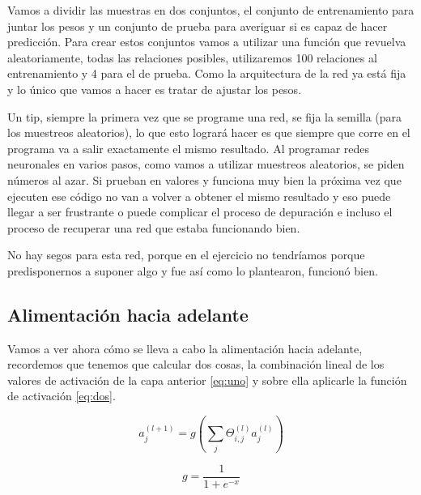 Vamos a dividir las muestras en dos conjuntos, el conjunto de entrenamiento para juntar los pesos y un conjunto de prueba para averiguar si es capaz de hacer predicción. Para crear estos conjuntos vamos a utilizar  una función que revuelva aleatoriamente, todas las relaciones posibles, utilizaremos 100 relaciones al entrenamiento y 4 para el de prueba. Como la arquitectura de la red ya está fija y lo único que vamos a hacer es tratar de ajustar los pesos.

Un tip, siempre la primera vez que se programe una red, se fija la semilla (para los muestreos aleatorios), lo que esto logrará hacer es que siempre que corre en el programa va a salir exactamente el mismo resultado. Al programar redes neuronales en varios pasos, como vamos a utilizar muestreos aleatorios, se piden números al azar. Si prueban en valores y funciona muy bien la próxima vez que ejecuten ese código no van a volver a obtener el mismo resultado y eso puede llegar a ser frustrante o puede complicar  el proceso de depuración e incluso el proceso de recuperar una red que estaba funcionando bien. 

No hay segos para esta red, porque  en el ejercicio no tendríamos porque predisponernos a suponer algo y fue así como lo plantearon, funcionó bien. 

\subsection{Alimentación hacia adelante}

Vamos a ver ahora cómo se lleva a cabo la alimentación hacia adelante, recordemos que tenemos que calcular dos cosas, la combinación lineal de los valores de activación de la capa anterior \ref{eq:uno} y sobre ella aplicarle la función de activación \ref{eq:dos}.

\begin{equation}
 a_{j}^{(l+1)} = g\left(\sum_{j}\Theta_{i,j}^{(l)}a_{j}^{(l)} \right)
 \label{eq:uno}
\end{equation}

\begin{equation}
 g = \dfrac{1}{1+e^{-x}}
 \label{eq:dos}
\end{equation}

